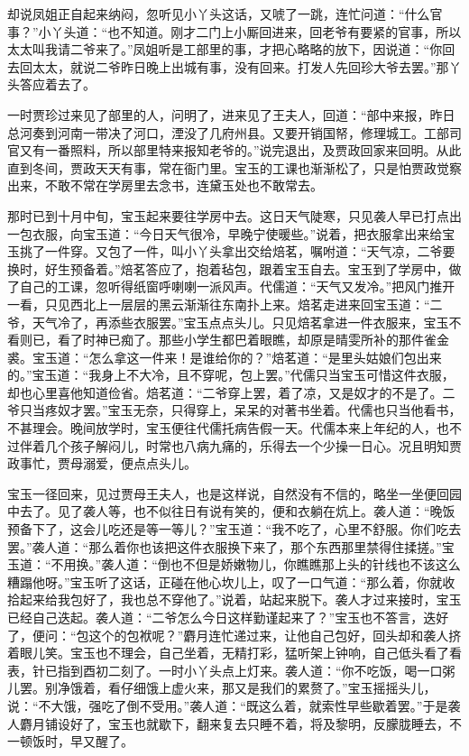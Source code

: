 

\begin{parag}
    却说凤姐正自起来纳闷，忽听见小丫头这话，又唬了一跳，连忙问道：“什么官事？”小丫头道：“也不知道。刚才二门上小厮回进来，回老爷有要紧的官事，所以太太叫我请二爷来了。”凤姐听是工部里的事，才把心略略的放下，因说道：“你回去回太太，就说二爷昨日晚上出城有事，没有回来。打发人先回珍大爷去罢。”那丫头答应着去了。
\end{parag}


\begin{parag}
    一时贾珍过来见了部里的人，问明了，进来见了王夫人，回道：“部中来报，昨日总河奏到河南一带决了河口，湮没了几府州县。又要开销国帑，修理城工。工部司官又有一番照料，所以部里特来报知老爷的。”说完退出，及贾政回家来回明。从此直到冬间，贾政天天有事，常在衙门里。宝玉的工课也渐渐松了，只是怕贾政觉察出来，不敢不常在学房里去念书，连黛玉处也不敢常去。
\end{parag}


\begin{parag}
    那时已到十月中旬，宝玉起来要往学房中去。这日天气陡寒，只见袭人早已打点出一包衣服，向宝玉道：“今日天气很冷，早晚宁使暖些。”说着，把衣服拿出来给宝玉挑了一件穿。又包了一件，叫小丫头拿出交给焙茗，嘱咐道：“天气凉，二爷要换时，好生预备着。”焙茗答应了，抱着毡包，跟着宝玉自去。宝玉到了学房中，做了自己的工课，忽听得纸窗呼喇喇一派风声。代儒道：“天气又发冷。”把风门推开一看，只见西北上一层层的黑云渐渐往东南扑上来。焙茗走进来回宝玉道：“二爷，天气冷了，再添些衣服罢。”宝玉点点头儿。只见焙茗拿进一件衣服来，宝玉不看则已，看了时神已痴了。那些小学生都巴着眼瞧，却原是晴雯所补的那件雀金裘。宝玉道：“怎么拿这一件来！是谁给你的？”焙茗道：“是里头姑娘们包出来的。”宝玉道：“我身上不大冷，且不穿呢，包上罢。”代儒只当宝玉可惜这件衣服，却也心里喜他知道俭省。焙茗道：“二爷穿上罢，着了凉，又是奴才的不是了。二爷只当疼奴才罢。”宝玉无奈，只得穿上，呆呆的对著书坐着。代儒也只当他看书，不甚理会。晚间放学时，宝玉便往代儒托病告假一天。代儒本来上年纪的人，也不过伴着几个孩子解闷儿，时常也八病九痛的，乐得去一个少操一日心。况且明知贾政事忙，贾母溺爱，便点点头儿。
\end{parag}


\begin{parag}
    宝玉一径回来，见过贾母王夫人，也是这样说，自然没有不信的，略坐一坐便回园中去了。见了袭人等，也不似往日有说有笑的，便和衣躺在炕上。袭人道：“晚饭预备下了，这会儿吃还是等一等儿？”宝玉道：“我不吃了，心里不舒服。你们吃去罢。”袭人道：“那么着你也该把这件衣服换下来了，那个东西那里禁得住揉搓。”宝玉道：“不用换。”袭人道：“倒也不但是娇嫩物儿，你瞧瞧那上头的针线也不该这么糟蹋他呀。”宝玉听了这话，正碰在他心坎儿上，叹了一口气道：“那么着，你就收拾起来给我包好了，我也总不穿他了。”说着，站起来脱下。袭人才过来接时，宝玉已经自己迭起。袭人道：“二爷怎么今日这样勤谨起来了？”宝玉也不答言，迭好了，便问：“包这个的包袱呢？”麝月连忙递过来，让他自己包好，回头却和袭人挤着眼儿笑。宝玉也不理会，自己坐着，无精打彩，猛听架上钟响，自己低头看了看表，针已指到酉初二刻了。一时小丫头点上灯来。袭人道：“你不吃饭，喝一口粥儿罢。别净饿着，看仔细饿上虚火来，那又是我们的累赘了。”宝玉摇摇头儿，说：“不大饿，强吃了倒不受用。”袭人道：“既这么着，就索性早些歇着罢。”于是袭人麝月铺设好了，宝玉也就歇下，翻来复去只睡不着，将及黎明，反朦胧睡去，不一顿饭时，早又醒了。
\end{parag}


